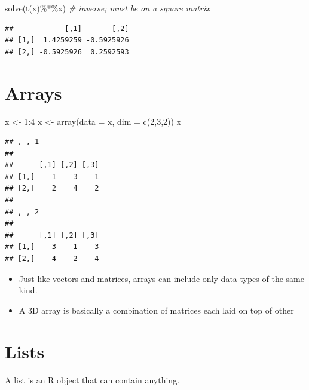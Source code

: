 \documentclass[
  11pt,
]{book}
\newenvironment{Shaded}{\begin{snugshade}}{\end{snugshade}}
\newcommand{\AttributeTok}[1]{\textcolor[rgb]{0.77,0.63,0.00}{#1}}
\newcommand{\CommentTok}[1]{\textcolor[rgb]{0.56,0.35,0.01}{\textit{#1}}}
\newcommand{\DecValTok}[1]{\textcolor[rgb]{0.00,0.00,0.81}{#1}}
\newcommand{\FunctionTok}[1]{\textcolor[rgb]{0.00,0.00,0.00}{#1}}
\newcommand{\NormalTok}[1]{#1}
\newcommand{\OtherTok}[1]{\textcolor[rgb]{0.56,0.35,0.01}{#1}}
\newcommand{\SpecialCharTok}[1]{\textcolor[rgb]{0.00,0.00,0.00}{#1}}
\begin{document}
\begin{Shaded}
\begin{Highlighting}[]
\FunctionTok{solve}\NormalTok{(}\FunctionTok{t}\NormalTok{(x)}\SpecialCharTok{\%*\%}\NormalTok{x) }\CommentTok{\# inverse; must be on a square matrix}
\end{Highlighting}
\end{Shaded}

\begin{verbatim}
##            [,1]       [,2]
## [1,]  1.4259259 -0.5925926
## [2,] -0.5925926  0.2592593
\end{verbatim}

\hypertarget{arrays}{%
\section{Arrays}\label{arrays}}

\begin{Shaded}
\begin{Highlighting}[]
\NormalTok{x }\OtherTok{\textless{}{-}} \DecValTok{1}\SpecialCharTok{:}\DecValTok{4}
\NormalTok{x }\OtherTok{\textless{}{-}} \FunctionTok{array}\NormalTok{(}\AttributeTok{data =}\NormalTok{ x, }\AttributeTok{dim =} \FunctionTok{c}\NormalTok{(}\DecValTok{2}\NormalTok{,}\DecValTok{3}\NormalTok{,}\DecValTok{2}\NormalTok{))}
\NormalTok{x}
\end{Highlighting}
\end{Shaded}

\begin{verbatim}
## , , 1
## 
##      [,1] [,2] [,3]
## [1,]    1    3    1
## [2,]    2    4    2
## 
## , , 2
## 
##      [,1] [,2] [,3]
## [1,]    3    1    3
## [2,]    4    2    4
\end{verbatim}

\begin{itemize}
\item
  Just like vectors and matrices, arrays can include only data types of the same kind.
\item
  A 3D array is basically a combination of matrices each laid on top of other
\end{itemize}

\hypertarget{lists}{%
\section{Lists}\label{lists}}

A list is an R object that can contain anything.
\end{document}
